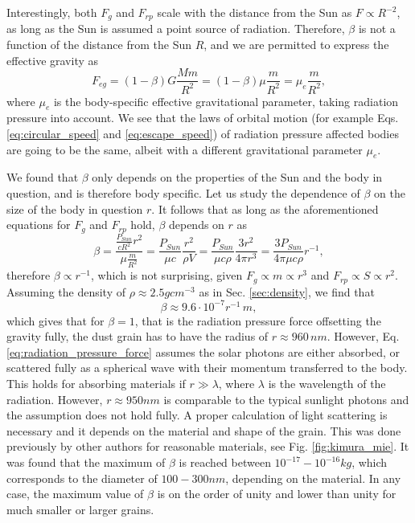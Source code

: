 Interestingly, both $F_g$ and $F_{rp}$ scale with the distance from the Sun as $F \propto {R^{-2}}$, as long as the Sun is assumed a point source of radiation. Therefore, $\beta$ is not a function of the distance from the Sun $R$, and we are permitted to express the effective gravity as 
\begin{equation}
    F_{eg} = (1-\beta) G \frac{M m}{R^2} = (1-\beta) \mu \frac{m}{R^2} = \mu_{e} \frac{m}{R^2},
    \label{eq:effective_gravity}
\end{equation}
where $\mu_{e}$ is the body-specific effective gravitational parameter, taking radiation pressure into account. We see that the laws of orbital motion (for example Eqs. \ref{eq:circular_speed} and \ref{eq:escape_speed}) of radiation pressure affected bodies are going to be the same, albeit with a different gravitational parameter $\mu_e$.

We found that $\beta$ only depends on the properties of the Sun and the body in question, and is therefore body specific. Let us study the dependence of $\beta$ on the size of the body in question $r$. It follows that as long as the aforementioned equations for $F_{g}$ and $F_{rp}$ hold, $\beta$ depends on $r$ as 
\begin{equation} 
    \beta = \frac{\frac{P_{Sun}}{c R^2} r^2}{\mu \frac{m}{R^2}} = \frac{P_{Sun}}{\mu c} \frac{r^2}{\rho V} = \frac{P_{Sun}}{\mu c \rho} \frac{3 r^2}{4 \pi r^3} = \frac{3 P_{Sun}}{4 \pi \mu c \rho} r^{-1},
\end{equation}
therefore $\beta \propto r^{-1}$, which is not surprising, given $F_{g} \propto m \propto r^{3}$ and 
$F_{rp} \propto S \propto r^{2}$. Assuming the density of $\rho \approx 2.5 \si{gcm^{-3}}$ as in Sec. \ref{sec:density}, we find that 
\begin{equation}
    \beta \approx 9.6 \cdot 10^{-7} r^{-1} \, \si{m},
    \label{eq:beta_estimate}
\end{equation}
which gives that for $\beta = 1$, that is the radiation pressure force offsetting the gravity fully, the dust grain has to have the radius of $r \approx 960 \, \si{nm}$. However, Eq. \eqref{eq:radiation_pressure_force} assumes the solar photons are either absorbed, or scattered fully as a spherical wave with their momentum transferred to the body. This holds for absorbing materials if $r \gg \lambda$, where $\lambda$ is the wavelength of the radiation. However, $r \approx 950 \si{nm}$ is comparable to the typical sunlight photons and the assumption does not hold fully. A proper calculation of light scattering is necessary and it depends on the material and shape of the grain. This was done previously by other authors \cite{kimura2003composition} for reasonable materials, see Fig. \ref{fig:kimura_mie}. It was found that the maximum of $\beta$ is reached between $10^{-17} - 10^{-16} \si{kg}$, which corresponds to the diameter of $100 - 300 \si{nm}$, depending on the material. In any case, the maximum value of $\beta$ is on the order of unity and lower than unity for much smaller or larger grains.

